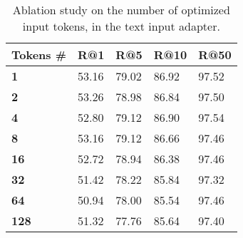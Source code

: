 \begin{table}[ht]
\centering
\caption{Ablation study on the number of optimized input tokens, in the text input adapter.}
\label{tab:ablations_input_tokens}
\begin{tabular}{@{}lllll@{}}
\toprule
 Tokens \# & R@1 & R@5 & R@10 & R@50 \\ \midrule
{\bf 1} & 53.16 & 79.02 & 86.92 & 97.52 \\
{\bf 2} & 53.26 & 78.98 & 86.84 & 97.50 \\
{\bf 4} & 52.80 & 79.12 & 86.90 & 97.54 \\
{\bf 8} & 53.16 & 79.12 & 86.66 & 97.46 \\
{\bf 16} & 52.72 & 78.94 & 86.38 & 97.46 \\
{\bf 32} & 51.42 & 78.22 & 85.84 & 97.32 \\
{\bf 64} & 50.94 & 78.00 & 85.54 & 97.46 \\
{\bf 128} & 51.32 & 77.76 & 85.64 & 97.40 \\
 \bottomrule
\end{tabular}
\end{table}

